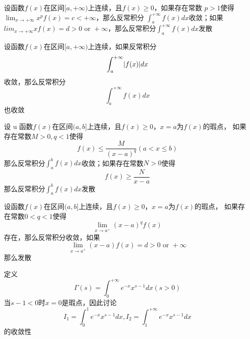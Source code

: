 \documentclass[11pt]{article}
\begin{document}
\begin{theorem}[极限审敛法 1]
设函数\(f(x)\)在区间\([a,+\infty)\)上连续，且\(f(x)\ge0\)，如果存在常数
\(p>1\)使得\(\lim_{x\to+\infty}x^pf(x)=c<+\infty\)，那么反常积分
\(\int_a^{+\infty}f(x)dx\)收敛；如果\(lim_{x\to+\infty}xf(x)=d>0\text{ or
   }+\infty\)，那么反常积分\(\int_a^{+\infty}f(x)dx\)发散
\end{theorem}

\begin{theorem}[]
设函数\(f(x)\)在区间\([a,+\infty)\)上连续，如果反常积分
\begin{equation*}
\int_a^{+\infty}\abs{f(x)}dx
\end{equation*}
收敛，那么反常积分
\begin{equation*}
\int_a^{+\infty}f(x)dx
\end{equation*}
也收敛
\end{theorem}

\begin{theorem}[比较审敛法 2]
设 u 函数\(f(x)\)在区间\((a,b]\)上连续，且\(f(x)\ge0\)，\(x=a\)为\(f(x)\)的瑕点，
如果存在常数\(M>0,q<1\)使得
\begin{equation*}
f(x)\le\frac{M}{(x-a)^q}(a<x\le b)
\end{equation*}
那么反常积分\(\int_a^bf(x)dx\)收敛；如果存在常数\(N>0\)使得
\begin{equation*}
f(x)\ge\frac{N}{x-a}
\end{equation*}
那么反常积分\(\int_a^bf(x)dx\)发散
\end{theorem}

\begin{theorem}[极限审敛法 2]
设函数\(f(x)\)在区间\((a,b]\)上连续，且\(f(x)\ge0\)，\(x=a\)为\(f(x)\)的瑕点，
如果存在常数\(0<q<1\)使得
\begin{equation*}
\lim_{x\to a^+}(x-a)^qf(x)
\end{equation*}
存在，那么反常积分收敛，如果
\begin{equation*}
\lim_{x\to a^+}(x-a)f(x)=d>0\text{ or }+\infty
\end{equation*}
那么发散
\end{theorem}

定义
\begin{equation*}
\Gamma(s)=\int_0^{+\infty}e^{-x}x^{s-1}dx(s>0)
\end{equation*}
当\(s-1<0\)时\(x=0\)是瑕点，因此讨论
\begin{equation*}
 I_1=\int_0^1e^{-x}x^{s-1}dx,I_2=\int_1^{+\infty}e^{-x}x^{s-1}dx
\end{equation*}
的收敛性
\end{document}
